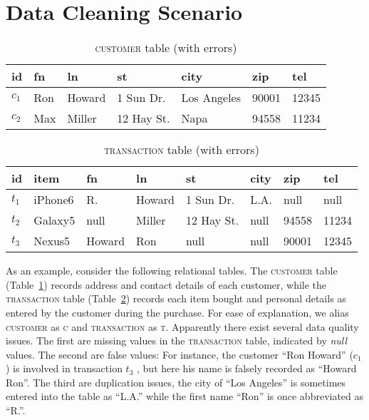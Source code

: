 \section{Data Cleaning Scenario}
\label{sec:example}
\begin{table}[t]\footnotesize
\scriptsize
\begin{tabular}{lllllll} \toprule 
\textbf{id} &  \textbf{fn} & \textbf{ln} & \textbf{st} & \textbf{city} & \textbf{zip} & \textbf{tel} \\ \midrule
$c_1$ & Ron & Howard & 1 Sun Dr. & Los Angeles & 90001 & 12345 \\
$c_2$ & Max & Miller & 12 Hay St. & Napa & 94558 & 11234 \\ \bottomrule
\end{tabular}
\vspace{-1em}
\caption{\textsc{customer} table (with errors)}
\label{tab:cust}
\end{table}

\begin{table}[t]\footnotesize
\scriptsize
\begin{tabular}{llllllll} \toprule 
\textbf{id} & \textbf{item} &  \textbf{fn} & \textbf{ln} & \textbf{st} & \textbf{city} & \textbf{zip} & \textbf{tel} \\ \midrule
$t_1$ & iPhone6 & R. & Howard & 1 Sun Dr. & L.A. & null & null \\
$t_2$ & Galaxy5 & null & Miller & 12 Hay St. & null & 94558 & 11234 \\
$t_3$ & Nexus5 & Howard & Ron & null & null & 90001 & 12345 \\ \bottomrule
\end{tabular}
\vspace{-1em}
\caption{\textsc{transaction} table (with errors)}
\label{tab:trans}
\end{table}


As an example, consider the following relational tables.  
The \textsc{customer} table (Table~\ref{tab:cust}) records address and contact details of 
each customer, while
the \textsc{transaction} table (Table~\ref{tab:trans}) records each item bought and personal details as 
entered by the customer during the purchase. 
For ease of explanation, we alias \textsc{customer} as \textsc{c} and 
\textsc{transaction} as \textsc{t}. Apparently there exist several data quality issues. 
The first are missing values in the \textsc{transaction} table, indicated by \emph{null} values. The 
second are false values: For instance, the customer ``Ron Howard'' ($c_1$) 
is involved in transaction $t_3$ , but here his name is falsely recorded as ``Howard Ron''. 
The third are 
duplication issues, the city of ``Los Angeles'' is sometimes entered into the table as ``L.A.'' while the 
first name ``Ron'' is once abbreviated as ``R.''. 

